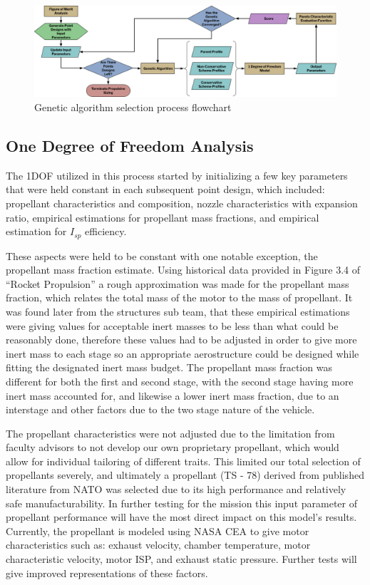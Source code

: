 \begin{figure}
    \centering
    \includegraphics[width=\linewidth]{images/genetic-flowchart}
    \caption{Genetic algorithm selection process flowchart}
    \label{figure:genetic-flowchart}
\end{figure}

\subsection{One Degree of Freedom Analysis}
The 1DOF utilized in this process started by initializing a few key parameters that were held constant in each subsequent point design, which included: propellant characteristics and composition, nozzle characteristics with expansion ratio, empirical estimations for propellant mass fractions, and empirical estimation for \(I_{sp}\) efficiency.

These aspects were held to be constant with one notable exception, the propellant mass fraction estimate. Using historical data provided in Figure 3.4 of ``Rocket Propulsion'' \cite{heister-rocket-propulsion} a rough approximation was made for the propellant mass fraction, which relates the total mass of the motor to the mass of propellant. It was found later from the structures sub team, that these empirical estimations were giving values for acceptable inert masses to be less than what could be reasonably done, therefore these values had to be adjusted in order to give more inert mass to each stage so an appropriate aerostructure could be designed while fitting the designated inert mass budget. The propellant mass fraction was different for both the first and second stage, with the second stage having more inert mass accounted for, and likewise a lower inert mass fraction, due to an interstage and other factors due to the two stage nature of the vehicle.

The propellant characteristics were not adjusted due to the limitation from faculty advisors to not develop our own proprietary propellant, which would allow for individual tailoring of different traits. This limited our total selection of propellants severely, and ultimately a propellant (TS - 78) derived from published literature from NATO was  selected due to its high performance and relatively safe manufacturability. In further testing for the mission this input parameter of propellant performance will have the most direct impact on this model’s results. Currently, the propellant is modeled using NASA CEA to give motor characteristics such as: exhaust velocity, chamber temperature, motor characteristic velocity, motor ISP, and exhaust static pressure. Further tests will give improved representations of these factors.


